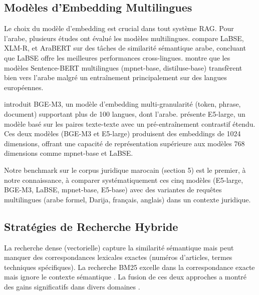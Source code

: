 \subsection{Modèles d'Embedding Multilingues}

Le choix du modèle d'embedding est crucial dans tout système RAG. Pour
l'arabe, plusieurs études ont évalué les modèles multilingues.
\cite{ali2022arabic} compare LaBSE, XLM-R, et AraBERT sur des tâches de
similarité sémantique arabe, concluant que LaBSE offre les meilleures
performances cross-lingues. \cite{reimers2020multilingual} montre que les
modèles Sentence-BERT multilingues (mpnet-base, distiluse-base) transfèrent
bien vers l'arabe malgré un entraînement principalement sur des langues
européennes.

\vspace{0.2cm}

\noindent \cite{wang2023bge} introduit BGE-M3, un modèle d'embedding
multi-granularité (token, phrase, document) supportant plus de 100 langues,
dont l'arabe. \cite{liang2023multilingual} présente E5-large, un modèle
basé sur les paires texte-texte avec un pré-entraînement contrastif étendu.
Ces deux modèles (BGE-M3 et E5-large) produisent des embeddings de 1024
dimensions, offrant une capacité de représentation supérieure aux modèles
768 dimensions comme mpnet-base et LaBSE.

\vspace{0.2cm}

\noindent Notre benchmark sur le corpus juridique marocain (section 5) est
le premier, à notre connaissance, à comparer systématiquement ces cinq
modèles (E5-large, BGE-M3, LaBSE, mpnet-base, E5-base) avec des variantes
de requêtes multilingues (arabe formel, Darija, français, anglais) dans un
contexte juridique.

\subsection{Stratégies de Recherche Hybride}

La recherche dense (vectorielle) capture la similarité sémantique mais peut
manquer des correspondances lexicales exactes (numéros d'articles, termes
techniques spécifiques). La recherche BM25 excelle dans la correspondance
exacte mais ignore le contexte sémantique \cite{robertson2009bm25}. La
fusion de ces deux approches a montré des gains significatifs dans divers
domaines \cite{lin2021hybrid}.

\vspace{0.2cm}

